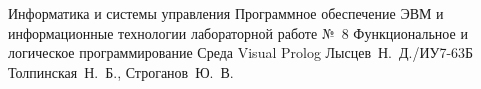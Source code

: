 \documentclass{bmstu}
\begin{document}
	
	\makereporttitle
	{Информатика и системы управления} %
	{Программное обеспечение ЭВМ и информационные технологии}
	{лабораторной работе №~8} %
	{Функциональное и логическое программирование} %
	{Среда Visual Prolog} %
	{} %
	{Лысцев~Н.~Д./ИУ7-63Б} %
	{Толпинская~Н.~Б., Строганов~Ю.~В.} %
	{}
	
	
	
	
	
\end{document}
